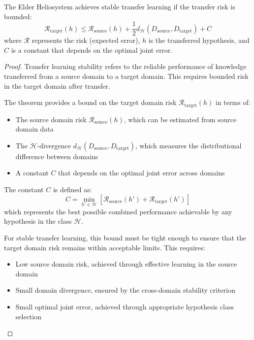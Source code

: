 \begin{theorem}
The Elder Heliosystem achieves stable transfer learning if the transfer risk is bounded:
\begin{equation}
\mathcal{R}_{\text{target}}(h) \leq \mathcal{R}_{\text{source}}(h) + \frac{1}{2}d_{\mathcal{H}}(D_{\text{source}}, D_{\text{target}}) + C
\end{equation}
where $\mathcal{R}$ represents the risk (expected error), $h$ is the transferred hypothesis, and $C$ is a constant that depends on the optimal joint error.
\end{theorem}

\begin{proof}
Transfer learning stability refers to the reliable performance of knowledge transferred from a source domain to a target domain. This requires bounded risk in the target domain after transfer.

The theorem provides a bound on the target domain risk $\mathcal{R}_{\text{target}}(h)$ in terms of:
\begin{itemize}
    \item The source domain risk $\mathcal{R}_{\text{source}}(h)$, which can be estimated from source domain data
    \item The $\mathcal{H}$-divergence $d_{\mathcal{H}}(D_{\text{source}}, D_{\text{target}})$, which measures the distributional difference between domains
    \item A constant $C$ that depends on the optimal joint error across domains
\end{itemize}

The constant $C$ is defined as:
\begin{equation}
C = \min_{h' \in \mathcal{H}} [\mathcal{R}_{\text{source}}(h') + \mathcal{R}_{\text{target}}(h')]
\end{equation}
which represents the best possible combined performance achievable by any hypothesis in the class $\mathcal{H}$.

For stable transfer learning, this bound must be tight enough to ensure that the target domain risk remains within acceptable limits. This requires:
\begin{itemize}
    \item Low source domain risk, achieved through effective learning in the source domain
    \item Small domain divergence, ensured by the cross-domain stability criterion
    \item Small optimal joint error, achieved through appropriate hypothesis class selection
\end{itemize}


\end{proof}
